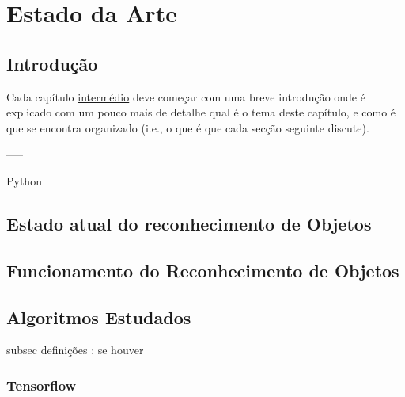 \chapter{Estado da Arte}
\label{chap:estado-da-arte}

\section{Introdução}
\label{chap2:sec:intro}
Cada capítulo \underline{intermédio} deve começar com uma breve introdução onde é explicado com um pouco mais de detalhe qual é o tema deste capítulo, e como é que se encontra organizado (i.e., o que é que cada secção seguinte discute). 



-----

Python

\section{Estado atual do reconhecimento de Objetos}
\label{chap2:sec:estado}



\section{Funcionamento do Reconhecimento de Objetos}
\label{chap2:sec:funcionamento}


\section{Algoritmos Estudados}
\label{chap2:sec:algoritmos}

subsec definições : se houver

\subsection{Tensorflow}
\label{chap2:subsec:tensorflow}

